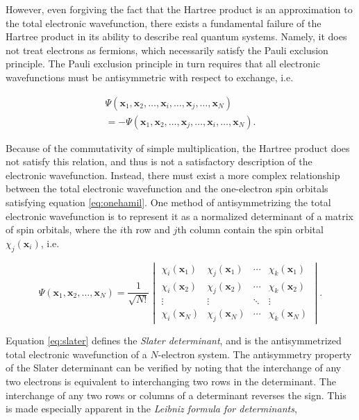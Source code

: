 However, even forgiving the fact that the Hartree product is an approximation to
the total electronic wavefunction, there exists a fundamental failure of the
Hartree product in its ability to describe real quantum systems.  Namely, it
does not treat electrons as fermions, which necessarily satisfy the Pauli
exclusion principle. The Pauli exclusion principle in turn requires that all
electronic wavefunctions must be antisymmetric with respect to exchange, i.e.

\begin{multline}
	\Psi(\bm x_1, \bm x_2, \dots, \bm x_i, \dots, \bm x_j, \dots, \bm x_N) \\
	= - \Psi(\bm x_1, \bm x_2, \dots, \bm x_j, \dots, \bm x_i, \dots, \bm x_N).
\end{multline}

Because of the commutativity of simple multiplication, the Hartree product does
not satisfy this relation, and thus is not a satisfactory description of the
electronic wavefunction. Instead, there must exist a more complex relationship
between the total electronic wavefunction and the one-electron spin orbitals
satisfying equation \ref{eq:onehamil}. One method of antisymmetrizing the total
electronic wavefunction is to represent it as a normalized determinant of a
matrix of spin orbitals, where the $i$th row and $j$th column contain the spin
orbital $\chi_j(\bm x_i)$, i.e.

\begin{equation}
	\Psi(\bm x_1, \bm x_2, \dots, \bm x_N)
	=
	\frac{1}{\sqrt{N!}}
	\begin{vmatrix}
		\chi_i (\bm x_1) & \chi_j (\bm x_1) & \cdots & \chi_k (\bm x_1) \\
		\chi_i (\bm x_2) & \chi_j (\bm x_2) & \cdots & \chi_k (\bm x_2) \\
		\vdots & \vdots & \ddots & \vdots \\
		\chi_i (\bm x_N) & \chi_j (\bm x_N) & \cdots & \chi_k (\bm x_N)
	\end{vmatrix}
	.
	\label{eq:slater}
\end{equation}

Equation \ref{eq:slater} defines the \emph{Slater determinant}, and is the
antisymmetrized total electronic wavefunction of a $N$-electron system. The
antisymmetry property of the Slater determinant can be verified by noting that
the interchange of any two electrons is equivalent to interchanging two rows in
the determinant. The interchange of any two rows or columns of a determinant
reverses the sign. This is made especially apparent in the \emph{Leibniz formula
for determinants},

